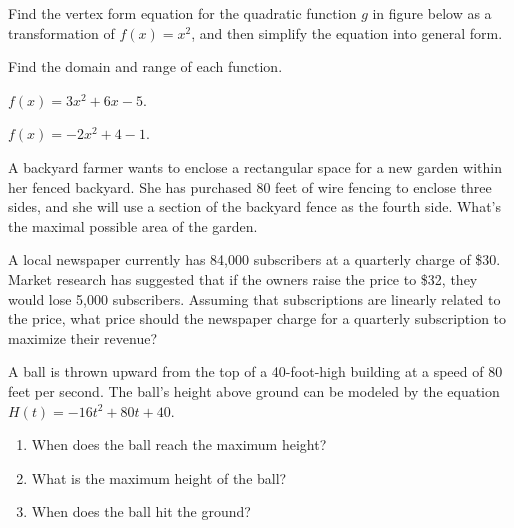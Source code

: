 \begin{example}
 Find the vertex form equation for the quadratic function $g$ in figure below as a transformation of $f(x)=x^2$, and then simplify the equation into general form.

\end{example}
\vspace*{-0.2\textheight}

\begin{example}
  Find the domain and range of each function.\\
  \begin{enumerate*}
    \item $f(x)=3x^2+6x-5$.
    \item $f(x)=-2x^2+4-1$.\hfill\null
  \end{enumerate*}
\end{example}

\begin{example}
  A backyard farmer wants to enclose a rectangular space for a new garden within her fenced backyard. She has purchased 80 feet of wire fencing to enclose three sides, and she will use a section of the backyard fence as the fourth side. What's the maximal possible area of the garden.
\end{example}

\newpage

\begin{example}
  A local newspaper currently has 84,000 subscribers at a quarterly charge of \$30. Market research has suggested that if the owners raise the price to \$32, they would lose 5,000 subscribers. Assuming that subscriptions are linearly related to the price, what price should the newspaper charge for a quarterly subscription to maximize their revenue?
\end{example}

\begin{example}
  A ball is thrown upward from the top of a 40-foot-high building at a speed of 80 feet per second. The ball's height above ground can be modeled by the equation \(H(t)=-16t^2+80t+40\).
\begin{enumerate}
  \item When does the ball reach the maximum height?
  \item What is the maximum height of the ball?  
  \item When does the ball hit the ground?
\end{enumerate}
\end{example}

